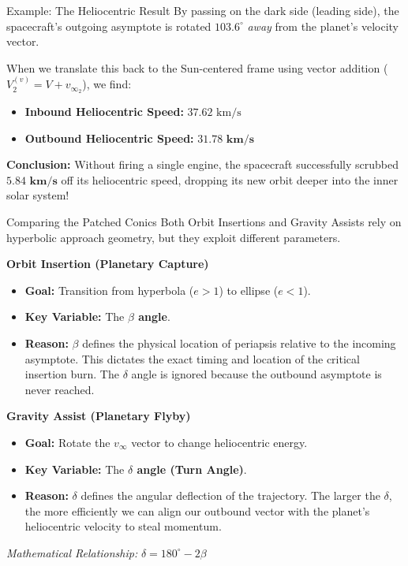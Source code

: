 \documentclass[11pt]{beamer}
\begin{document}
\begin{frame}{Example: The Heliocentric Result}
    By passing on the dark side (leading side), the spacecraft's outgoing asymptote is rotated $103.6^\circ$ \textit{away} from the planet's velocity vector. 
    
    \vspace{0.2cm}
    When we translate this back to the Sun-centered frame using vector addition ($V_2^{(v)} = V + v_{\infty_2}$), we find:
    
    \begin{itemize}
        \item \textbf{Inbound Heliocentric Speed:} $37.62 \text{ km/s}$
        \item \textbf{Outbound Heliocentric Speed:} $\mathbf{31.78 \text{ km/s}}$
    \end{itemize}
    
    \vspace{0.2cm}
    \textbf{Conclusion:} 
    Without firing a single engine, the spacecraft successfully scrubbed $\mathbf{5.84 \text{ km/s}}$ off its heliocentric speed, dropping its new orbit deeper into the inner solar system!
\end{frame}

\begin{frame}{Comparing the Patched Conics}
    Both Orbit Insertions and Gravity Assists rely on hyperbolic approach geometry, but they exploit different parameters.
    
    \vspace{0.3cm}
    \textbf{Orbit Insertion (Planetary Capture)}
    \begin{itemize}
        \item \textbf{Goal:} Transition from hyperbola ($e > 1$) to ellipse ($e < 1$).
        \item \textbf{Key Variable:} The \textbf{$\beta$ angle}.
        \item \textbf{Reason:} $\beta$ defines the physical location of periapsis relative to the incoming asymptote. This dictates the exact timing and location of the critical insertion burn. The $\delta$ angle is ignored because the outbound asymptote is never reached.
    \end{itemize}

    \vspace{0.3cm}
    \textbf{Gravity Assist (Planetary Flyby)}
    \begin{itemize}
        \item \textbf{Goal:} Rotate the $v_\infty$ vector to change heliocentric energy.
        \item \textbf{Key Variable:} The \textbf{$\delta$ angle (Turn Angle)}.
        \item \textbf{Reason:} $\delta$ defines the angular deflection of the trajectory. The larger the $\delta$, the more efficiently we can align our outbound vector with the planet's heliocentric velocity to steal momentum.
    \end{itemize}
    
    \vspace{0.2cm}
    \textit{Mathematical Relationship:} $\delta = 180^\circ - 2\beta$
\end{frame}
\end{document}
